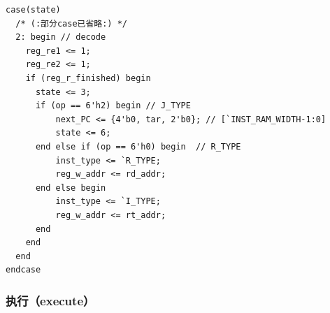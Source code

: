 \documentclass[12pt,a4paper,UTF8]{article}
\begin{document}
\begin{lstlisting}[style=verilog-style]
case(state)
  /* (:部分case已省略:) */
  2: begin // decode
    reg_re1 <= 1;
    reg_re2 <= 1;
    if (reg_r_finished) begin
      state <= 3;
      if (op == 6'h2) begin // J_TYPE
          next_PC <= {4'b0, tar, 2'b0}; // [`INST_RAM_WIDTH-1:0]
          state <= 6;
      end else if (op == 6'h0) begin  // R_TYPE
          inst_type <= `R_TYPE;
          reg_w_addr <= rd_addr;
      end else begin
          inst_type <= `I_TYPE;
          reg_w_addr <= rt_addr;
      end
    end
  end
endcase
\end{lstlisting}


\subsubsection{执行（execute）}
\end{document}
